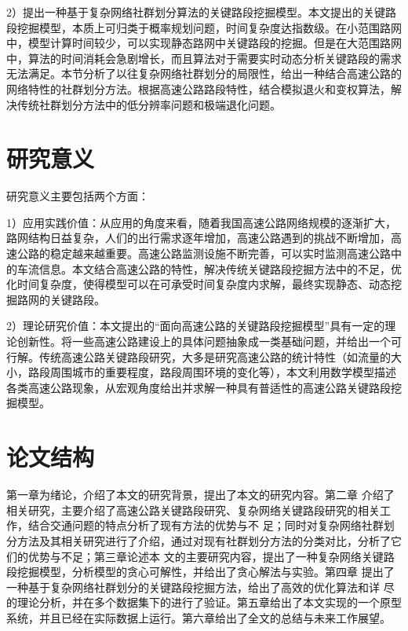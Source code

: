 		2）提出一种基于复杂网络社群划分算法的关键路段挖掘模型。本文提出的关键路段挖掘模型，本质上可归类于概率规划问题，时间复杂度达指数级。在小范围路网中，模型计算时间较少，可以实现静态路网中关键路段的挖掘。但是在大范围路网中，算法的时间消耗会急剧增长，而且算法对于需要实时动态分析关键路段的需求无法满足。本节分析了以往复杂网络社群划分的局限性，给出一种结合高速公路的网络特性的社群划分方法。根据高速公路路段特性，结合模拟退火和变权算法，解决传统社群划分方法中的低分辨率问题\parencite{WeightPretreatment}和极端退化问题\parencite{WeightPretreatment}。

\section{研究意义}
		研究意义主要包括两个方面：

		1）应用实践价值：从应用的角度来看，随着我国高速公路网络规模的逐渐扩大，路网结构日益复杂，人们的出行需求逐年增加，高速公路遇到的挑战不断增加，高速公路的稳定越来越重要。高速公路监测设施不断完善，可以实时监测高速公路中的车流信息。本文结合高速公路的特性，解决传统关键路段挖掘方法中的不足，优化时间复杂度，使得模型可以在可承受时间复杂度内求解，最终实现静态、动态挖掘路网的关键路段。

		2）理论研究价值：本文提出的“面向高速公路的关键路段挖掘模型”具有一定的理论创新性。将一些高速公路建设上的具体问题抽象成一类基础问题，并给出一个可行解。传统高速公路关键路段研究，大多是研究高速公路的统计特性（如流量的大小，路段周围城市的重要程度，路段周围环境的变化等），本文利用数学模型描述各类高速公路现象，从宏观角度给出并求解一种具有普适性的高速公路关键路段挖掘模型。
		
\section{论文结构}
    第一章为绪论，介绍了本文的研究背景，提出了本文的研究内容。第二章
介绍了相关研究，主要介绍了高速公路关键路段研究、复杂网络关键路段研究的相关工作，结合交通问题的特点分析了现有方法的优势与不
足；同时对复杂网络社群划分方法及其相关研究进行了介绍，通过对现有社群划分方法的分类对比，分析了它们的优势与不足；第三章论述本
文的主要研究内容，提出了一种复杂网络关键路段挖掘模型，分析模型的贪心可解性，并给出了贪心解法与实验。第四章
提出了一种基于复杂网络社群划分的关键路段挖掘方法，给出了高效的优化算法和详
尽的理论分析，并在多个数据集下的进行了验证。第五章给出了本文实现的一个原型系统，并且已经在实际数据上运行。第六章给出了全文的总结与未来工作展望。



